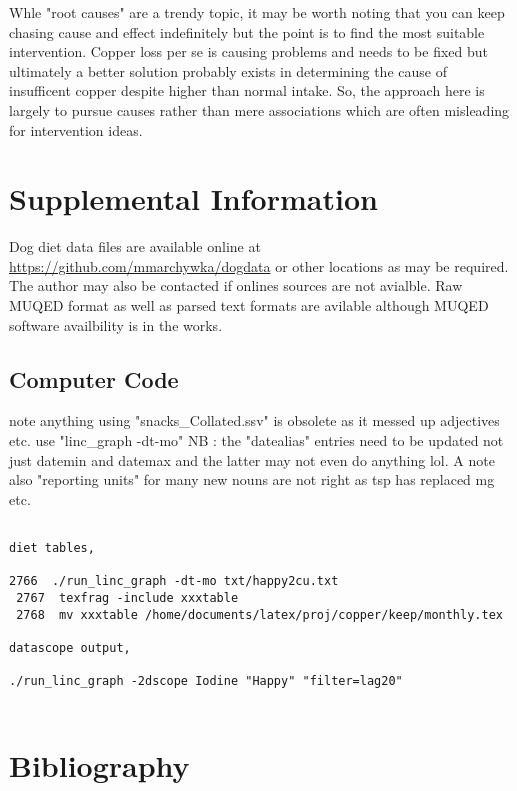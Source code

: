 Whle "root causes" are a trendy topic, it may be worth noting
that you can keep chasing cause and effect indefinitely
but the point is to find the most suitable intervention.
Copper loss per se is causing problems and needs to be fixed
but ultimately a better solution probably exists in determining
the cause of insufficent copper despite higher than normal intake.
So, the approach here is largely to pursue causes rather than
mere associations which are often misleading for intervention
ideas.  



\section{Supplemental Information}

Dog diet data files are available online at
{\url{https://github.com/mmarchywka/dogdata}}
or other locations as may be required.
The author may also be contacted if onlines sources are not
avialble. Raw MUQED format as well as parsed text formats
are avilable although MUQED software availbility is in the works.


\subsection{Computer Code}
note anything using "snacks\_Collated.ssv" is obsolete as it messed
up adjectives etc. use "linc\_graph -dt-mo"
NB : the "datealias" entries need to be updated not just datemin and datemax
and the latter may not even do anything lol.  A note also
"reporting units" for many new nouns are not right as tsp
 has replaced mg etc. 

\begin{lstlisting}

diet tables, 

2766  ./run_linc_graph -dt-mo txt/happy2cu.txt 
 2767  texfrag -include xxxtable 
 2768  mv xxxtable /home/documents/latex/proj/copper/keep/monthly.tex

datascope output, 

./run_linc_graph -2dscope Iodine "Happy" "filter=lag20"


\end{lstlisting}
\section{Bibliography}






